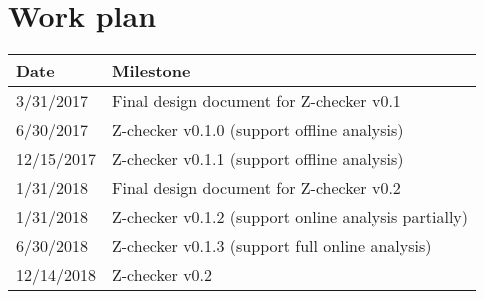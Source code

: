 \section{Work plan}

\begin{tabular}{|p{0.7in}|p{5.5in}|}\hline
\textbf{Date}  & \textbf{Milestone} \\\hline
3/31/2017 & Final design document for Z-checker v0.1 \\\hline
6/30/2017 & Z-checker v0.1.0 (support offline analysis)\\\hline
12/15/2017 & Z-checker v0.1.1 (support offline analysis)\\\hline
1/31/2018 & Final design document for Z-checker v0.2 \\\hline
1/31/2018 & Z-checker v0.1.2 (support online analysis partially)\\\hline
6/30/2018 & Z-checker v0.1.3 (support full online analysis) \\\hline
12/14/2018 & Z-checker v0.2 \\\hline
\end{tabular}

